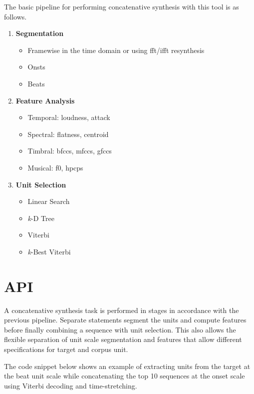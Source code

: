 The basic pipeline for performing concatenative synthesis with this tool is as follows.

\begin{enumerate}
  \item \textbf{Segmentation}
\begin{itemize}
  \item Framewise in the time domain or using \acrshort{fft}/\acrshort{ifft} resynthesis 
  \item Onsts
  \item Beats
\end{itemize}
\item \textbf{Feature Analysis}
\begin{itemize}
\item Temporal: loudness, attack
\item Spectral: flatness, centroid
\item Timbral: \acrshort{bfcc}s, \acrshort{mfcc}s, \acrshort{gfcc}s
\item Musical: f0, \acrshort{hpcp}s
\end{itemize}
\item \textbf{Unit Selection}
\begin{itemize}
  \item Linear Search
  \item \textit{k}-D Tree
  \item Viterbi
  \item \textit{k}-Best Viterbi
\end{itemize}
\end{enumerate}

\section{API}

A concatenative synthesis task is performed in stages in accordance with the previous pipeline. Separate statements segment the units and compute features before finally combining a sequence with unit selection. This also allows the flexible separation of unit scale segmentation and features that allow different specifications for target and corpus unit. 

The code snippet below shows an example of extracting units from the target at the beat unit scale while concatenating the top 10 sequences at the onset scale using Viterbi decoding and time-stretching.


